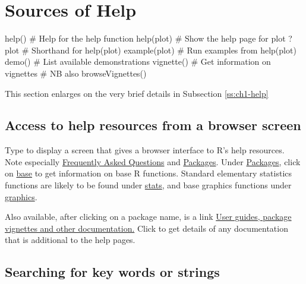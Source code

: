 \section{Sources of Help}\label{sec:workinghelp}

\noindent
\begin{framed}
\vspace*{-10pt}
\begin{Schunk}
\begin{Sinput}
help()           # Help for the help function
help(plot)       # Show the help page for plot
?plot            # Shorthand for help(plot)
example(plot)    # Run examples from help(plot)
demo()           # List available demonstrations
vignette()       # Get information on vignettes
                 # NB also browseVignettes()
\end{Sinput}
\end{Schunk}
\vspace*{-10pt}
\end{framed}

\noindent
This section enlarges on the very brief details in Subsection \ref{ss:ch1-help}

\subsection*{Access to help resources from a browser screen}
Type  to display a screen that gives a browser
interface to R's help resources.  Note especially
\underline{Frequently Asked Questions} and \underline{Packages}.
Under \underline{Packages}, click on \underline{base} to get
information on base R functions. Standard elementary statistics
functions are likely to be found under \underline{stats}, and base
graphics functions under \underline{graphics}.

Also available, after clicking on a package name, is a link
\underline{User guides, package vignettes and other documentation.}
Click to get details of any documentation that is additional to the
help pages.

\subsection*{Searching for key words or strings}

